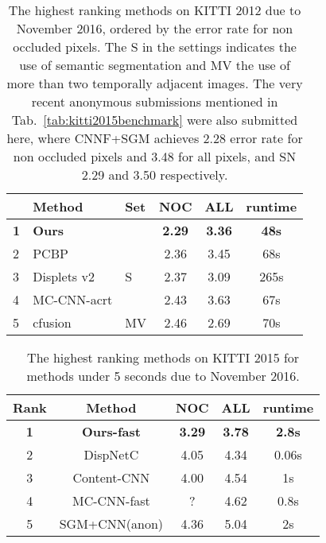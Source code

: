 \documentclass[10pt, twocolumn, letterpaper]{article}
\begin{document}
\begin{table}[t]
\begin{center}
\begin{tabular}{|l l l c c c|}
\hline
		 		& Method 				& Set 		& NOC 		& ALL 		& runtime  \\\hline
	\bf{1} 		& \bf{Ours}  		&			& \bf{2.29}	& \bf{3.36} & \bf{48s} \\
		2 		& PCBP\cite{ntouskos2016confidence}  				&  			& 2.36 		& 3.45 		& 68s \\
		3 		& Displets v2\cite{displets}  			& S 		& 2.37 		& 3.09 		& 265s \\
		4 		& MC-CNN-acrt\cite{newlecun} 			&  			& 2.43 		& 3.63 		& 67s \\
		5 & cfusion\cite{ntouskos2016confidence}	&  MV	& 2.46 		& 2.69 		& 70s \\
\hline
\end{tabular}
\end{center}
\caption{The highest ranking methods on KITTI 2012 due to November 2016, ordered by the error rate for non occluded pixels. The S in the settings indicates the use of semantic segmentation and MV the use of more than two temporally adjacent images. The very recent anonymous submissions mentioned in Tab.~\ref{tab:kitti2015benchmark} were also submitted here, where CNNF+SGM achieves 2.28 error rate for non occluded pixels and 3.48 for all pixels, and SN 2.29 and 3.50 respectively.}
\label{tab:kittibenchmark}
\end{table}

\begin{table}[t]
\begin{center}
\begin{tabular}{|c c c c c|}
\hline
Rank & Method & NOC & ALL & runtime  \\
\hline
\bf{1} & \bf{Ours-fast} & \bf{3.29} & \bf{3.78} & \bf{2.8s} \\
2& DispNetC\cite{dispnet} 		&4.05  &4.34  & 0.06s \\
3& Content-CNN\cite{efficient}  	&4.00  &4.54 & 1s \\
4& MC-CNN-fast\cite{newlecun}  	& ?  & 4.62 & 0.8s \\
5& SGM+CNN(anon)	& 4.36 & 5.04 & 2s \\
\hline
\end{tabular}
\end{center}
\caption{The highest ranking methods on KITTI 2015 for methods under 5 seconds due to November 2016.}
\label{tab:fast_kitti2015}
\end{table}
\end{document}
